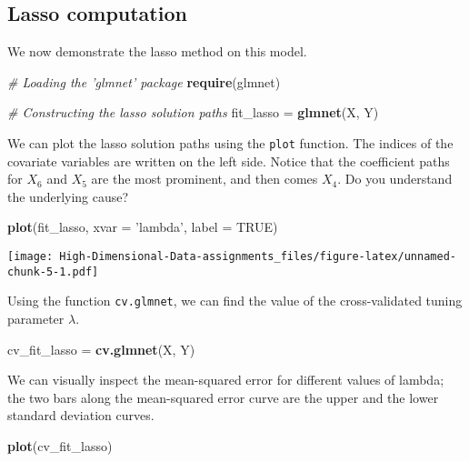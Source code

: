 \documentclass[
]{book}
\newenvironment{Shaded}{\begin{snugshade}}{\end{snugshade}}
\newcommand{\CommentTok}[1]{\textcolor[rgb]{0.56,0.35,0.01}{\textit{#1}}}
\newcommand{\DataTypeTok}[1]{\textcolor[rgb]{0.13,0.29,0.53}{#1}}
\newcommand{\KeywordTok}[1]{\textcolor[rgb]{0.13,0.29,0.53}{\textbf{#1}}}
\newcommand{\NormalTok}[1]{#1}
\newcommand{\OtherTok}[1]{\textcolor[rgb]{0.56,0.35,0.01}{#1}}
\newcommand{\StringTok}[1]{\textcolor[rgb]{0.31,0.60,0.02}{#1}}
\begin{document}
\hypertarget{lasso-computation}{%
\subsection{Lasso computation}\label{lasso-computation}}

We now demonstrate the lasso method on this model.

\begin{Shaded}
\begin{Highlighting}[]
\CommentTok{# Loading the 'glmnet' package}
\KeywordTok{require}\NormalTok{(glmnet)}

\CommentTok{# Constructing the lasso solution paths}
\NormalTok{fit_lasso =}\StringTok{ }\KeywordTok{glmnet}\NormalTok{(X, Y)}
\end{Highlighting}
\end{Shaded}

We can plot the lasso solution paths using the \texttt{plot} function. The indices of the covariate variables are written on the left side. Notice that the coefficient paths for \(X_6\) and \(X_5\) are the most prominent, and then comes \(X_4\). Do you understand the underlying cause?

\begin{Shaded}
\begin{Highlighting}[]
\KeywordTok{plot}\NormalTok{(fit_lasso, }\DataTypeTok{xvar =} \StringTok{'lambda'}\NormalTok{, }\DataTypeTok{label =} \OtherTok{TRUE}\NormalTok{)}
\end{Highlighting}
\end{Shaded}

\texttt{[image: High-Dimensional-Data-assignments\_files/figure-latex/unnamed-chunk-5-1.pdf]}

Using the function \texttt{cv.glmnet}, we can find the value of the cross-validated tuning parameter \(\lambda\).

\begin{Shaded}
\begin{Highlighting}[]
\NormalTok{cv_fit_lasso =}\StringTok{ }\KeywordTok{cv.glmnet}\NormalTok{(X, Y)}
\end{Highlighting}
\end{Shaded}

We can visually inspect the mean-squared error for different values of lambda; the two bars along the mean-squared error curve are the upper and the lower standard deviation curves.

\begin{Shaded}
\begin{Highlighting}[]
\KeywordTok{plot}\NormalTok{(cv_fit_lasso)}
\end{Highlighting}
\end{Shaded}
\end{document}
